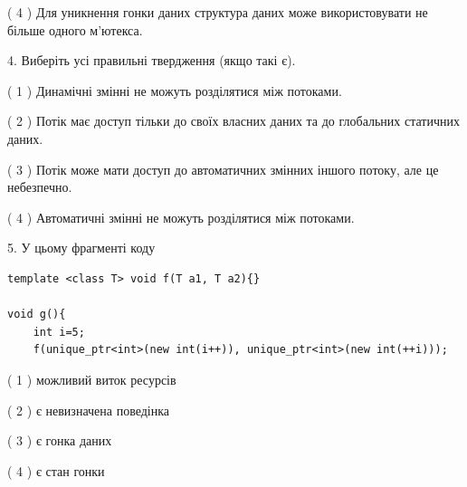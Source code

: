 \documentclass[12pt, ukrainian]{article}
\begin{document}
\begin {large}
{( 4 ) Для уникнення гонки даних структура даних може використовувати не більше одного м’ютекса.%


4. Виберіть усі правильні твердження (якщо такі є).\par
\vspace{2mm}

( 1 ) Динамічні змінні не можуть розділятися між потоками.%

( 2 ) Потік має доступ тільки до своїх власних даних та до глобальних статичних даних.%

( 3 ) Потік може мати доступ до автоматичних змінних іншого потоку, але це небезпечно.%

( 4 ) Автоматичні змінні не можуть розділятися між потоками.%


5. У цьому фрагменті коду
\begin{verbatim}
template <class T> void f(T a1, T a2){}

void g(){
    int i=5;
    f(unique_ptr<int>(new int(i++)), unique_ptr<int>(new int(++i)));
\end{verbatim}

( 1 ) можливий виток ресурсів%

( 2 ) є невизначена поведінка%

( 3 ) є гонка даних%

( 4 ) є стан гонки%
}
\end {large}
\end{document}
